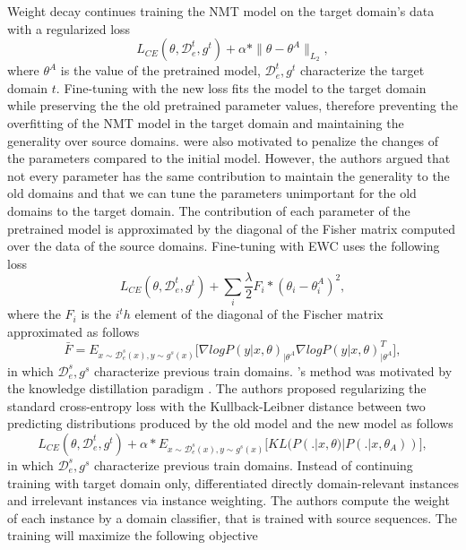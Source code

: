 Weight decay \citep{Miceli17regularization} continues training the NMT model on the target domain's data with a regularized loss 
\begin{equation}
L_{CE}(\theta, \mathcal{D}^t_e, g^t) + \alpha * \parallel \theta - \theta^{A} \parallel_{L_2},
\end{equation}
where $\theta^{A}$ is the value of the pretrained model, $\mathcal{D}^t_e, g^t$ characterize the target domain $t$. Fine-tuning with the new loss fits the model to the target domain while preserving the the old pretrained parameter values, therefore preventing the overfitting of the NMT model in the target domain and maintaining the generality over source domains. \citet{Kirk16overcoming, Brian19overcoming, Saunders19domain} were also motivated to penalize the changes of the parameters compared to the initial model. However, the authors argued that not every parameter has the same contribution to maintain the generality to the old domains and that we can tune the parameters unimportant for the old domains to the target domain. The contribution of each parameter of the pretrained model is approximated by the diagonal of the Fisher matrix computed over the data of the source domains. Fine-tuning with EWC uses the following loss
\begin{equation}
L_{CE}(\theta, \mathcal{D}^t_e, g^t) + \sum_{i} \frac{\lambda}{2} F_i * (\theta_i - \theta_i^{A})^2,
\end{equation}
where the $F_i$ is the $i^th$ element of the diagonal of the Fischer matrix approximated as follows
\begin{equation}
\bar{F} = E_{x \sim \mathcal{D}_e^s(x), y \sim g^s(x)} \big[ \nabla logP(y|x,\theta)_{| \theta^{A}} \nabla logP(y|x,\theta)_{| \theta^{A}}^{T} \big],
\end{equation}
in which $\mathcal{D}^s_e, g^s$ characterize previous train domains.
\citet{Dakwle17fine}'s method was motivated by the knowledge distillation paradigm \citep{Hinton15Distilling}. The authors proposed regularizing the standard cross-entropy loss with the Kullback-Leibner distance \citep{Kullback51On} between two predicting distributions produced by the old model and the new model as follows
\begin{equation}
L_{CE}(\theta, \mathcal{D}^t_e, g^t) + \alpha * E_{x \sim \mathcal{D}_e^s(x), y \sim g^s(x)} \big[ KL(P(.|x,\theta) | P(.|x,\theta_{A})) \big],
\end{equation}
in which $\mathcal{D}^s_e, g^s$ characterize previous train domains.
Instead of continuing training with target domain only, \citet{Chen17cost} differentiated directly domain-relevant instances and irrelevant instances via instance weighting. The authors compute the weight of each instance by a domain classifier, that is trained with source sequences. The training will maximize the following objective 
